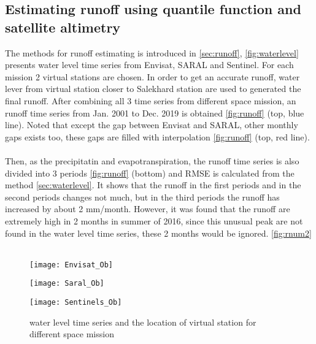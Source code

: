 \subsection{Estimating runoff using quantile function and satellite altimetry}
 The methods for runoff estimating is introduced in \autoref{sec:runoff}, \autoref{fig:waterlevel} presents water level time series from Envisat, SARAL and Sentinel. For each mission 2 virtual stations are chosen. In order to get an accurate runoff, water lever from virtual station closer to Salekhard station are used to generated the final runoff. After combining all 3 time series from different space mission, an runoff time series from Jan. 2001 to Dec. 2019 is obtained \autoref{fig:runoff} (top, blue line). Noted that except the gap between Envisat and SARAL, other monthly gaps exists too, these gaps are filled with interpolation \autoref{fig:runoff} (top, red line). \\\\
 Then, as the precipitatin and evapotranspiration, the runoff time series is also divided into 3 periods \autoref{fig:runoff} (bottom) and RMSE is calculated from the method \autoref{sec:waterlevel}. It shows that the runoff in the first periods and in the second periods changes not much, but in the third periods the runoff has increased by about 2 mm/month. However, it was found that the runoff are extremely high in 2 months in summer of 2016, since this unusual peak are not found in the water level time series, these 2 months would be ignored. \ref{fig:rnum2} \\\\
 \begin{figure}[htbp]
 	\centering
 	\begin{minipage}[t]{0.7\textwidth}
 		\centering
 		\texttt{[image: Envisat\_Ob]} %
 	\end{minipage}
 	\begin{minipage}[t]{0.7\textwidth}
 		\centering
 		\texttt{[image: Saral\_Ob]} %
 	\end{minipage}
 \begin{minipage}[t]{0.7\textwidth}
 	\centering
 	\texttt{[image: Sentinels\_Ob]} %
 \end{minipage}
 \caption{water level time series and the location of virtual station for different space mission}
 \label{fig:waterlevel}
 \end{figure}
